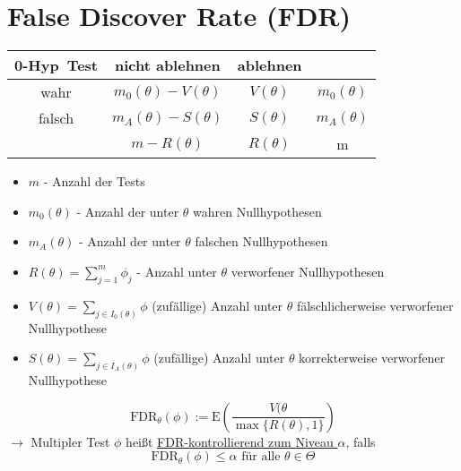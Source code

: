 \section{False Discover Rate (FDR) }
\begin{tabular}{c|c|c|c}
0-Hyp\ Test & nicht ablehnen & ablehnen & \\ \hline
wahr & \cellcolor{yellow!25} $m_0 (\theta) - V(\theta)$ & \cellcolor{yellow!25}$V(\theta)$ & \cellcolor{yellow!25}$m_0(\theta)$\\ \hline
falsch &\cellcolor{yellow!25}$m_A (\theta) - S(\theta)$  &\cellcolor{yellow!25} $S(\theta)$ &\cellcolor{yellow!25} $m_A(\theta)$\\ \hline
& \cellcolor{red!25}$m-R(\theta)$ & \cellcolor{red!25}$R(\theta)$ & m\\
\end{tabular}

\begin{itemize}
 \item $m$ - Anzahl der Tests \\
 \item $m_0 (\theta)$ - Anzahl der unter $\theta$ wahren Nullhypothesen \\
 \item $m_A (\theta)$ - Anzahl der unter $\theta$ falschen Nullhypothesen \\
 \item $R(\theta) = \sum\limits_{j=1}^m \phi_j$ - Anzahl unter $\theta$ verworfener Nullhypothesen
 \item $V(\theta) = \sum\limits_{j \in I_0(\theta)} \phi $ (zufällige) Anzahl unter $\theta$ fälschlicherweise verworfener Nullhypothese 
 \item $S(\theta) = \sum\limits_{j \in I_A(\theta)} \phi $ (zufällige) Anzahl unter $\theta$ korrekterweise verworfener Nullhypothese 
\end{itemize}

\[ \text{FDR}_{\theta}(\phi) := \text{E} \left( \frac{V(\theta}{\max\{R(\theta),1\}}\right) \]
$\rightarrow$ Multipler Test $\phi$ heißt \underline{FDR-kontrollierend zum Niveau $\alpha$}, falls
\[ \text{FDR}_{\theta}(\phi) \leq \alpha \text{ für alle } \theta \in \Theta \]


